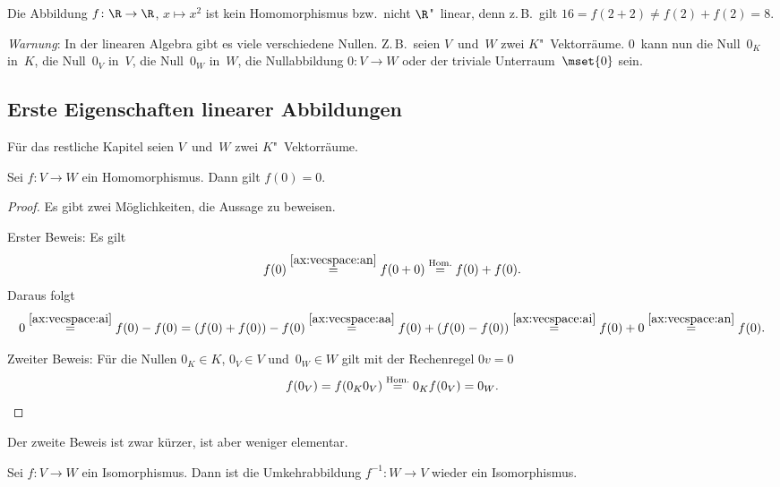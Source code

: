 \documentclass[a4paper]{article}
\begin{document}
\begin{example}
    Die Abbildung $f\colon \R \to \R$, $x \mapsto x^2$ ist kein Homomorphismus bzw.\ nicht $\R$"~linear, denn z.\,B.\ gilt $16 = f(2+2) \neq f(2)+f(2) = 8$.
\end{example}

\emph{Warnung}: In der linearen Algebra gibt es viele verschiedene Nullen. Z.\,B.\ seien $V$~und~$W$ zwei $K$"~Vektorräume. $0$~kann nun die Null~$0_K$ in~$K$, die Null~$0_V$ in~$V$, die Null~$0_W$ in~$W$, die Nullabbildung $0\colon V \to W$ oder der triviale Unterraum~$\mset{0}$ sein.

\subsection{Erste Eigenschaften linearer Abbildungen}

Für das restliche Kapitel seien $V$~und~$W$ zwei $K$"~Vektorräume.

\begin{lemma}
    Sei $f\colon V \to W$ ein Homomorphismus. Dann gilt $f(0) = 0$.
\end{lemma}

\begin{proof}
    Es gibt zwei Möglichkeiten, die Aussage zu beweisen.

    Erster Beweis: Es gilt
    \begin{equation*}
        f(0) \overset{\ref{ax:vecspace:an}}{=} f(0+0) \overset{\text{Hom.}}{=} f(0)+f(0).
    \end{equation*}
    Daraus folgt
    \begin{equation*}
        0 \overset{\ref{ax:vecspace:ai}}{=} f(0)-f(0) = (f(0)+f(0)) - f(0) \overset{\ref{ax:vecspace:aa}}{=} f(0) + (f(0)-f(0)) \overset{\ref{ax:vecspace:ai}}{=} f(0)+0 \overset{\ref{ax:vecspace:an}}{=} f(0).
    \end{equation*}

    Zweiter Beweis: Für die Nullen $0_K \in K$, $0_V \in V$ und~$0_W \in W$ gilt mit der Rechenregel $0v = 0$
    \begin{equation*}
        f(0_V) = f(0_K0_V) \overset{\text{Hom.}}{=} 0_Kf(0_V) = 0_W. \qedhere
    \end{equation*}
\end{proof}

Der zweite Beweis ist zwar kürzer, ist aber weniger elementar.

\begin{lemma}
    Sei $f\colon V \to W$ ein Isomorphismus. Dann ist die Umkehrabbildung $f^{-1}\colon W \to V$ wieder ein Isomorphismus.
\end{lemma}
\end{document}
